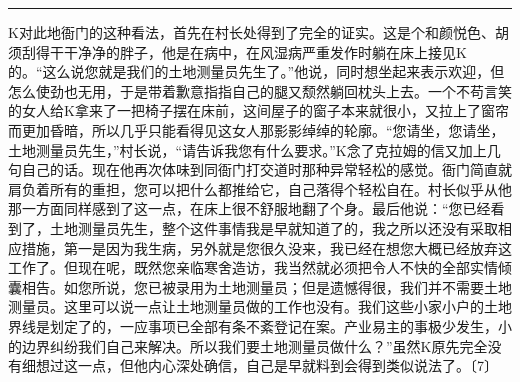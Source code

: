 \documentclass[12pt,a4paper]{article}
\begin{document}
\noindent\rule{\textwidth}{0.4pt}

\vspace{0.3em}



K对此地衙门的这种看法，首先在村长处得到了完全的证实。这是个和颜悦色、胡须刮得干干净净的胖子，他是在病中，在风湿病严重发作时躺在床上接见K的。“这么说您就是我们的土地测量员先生了。”他说，同时想坐起来表示欢迎，但怎么使劲也无用，于是带着歉意指指自己的腿又颓然躺回枕头上去。一个不苟言笑的女人给K拿来了一把椅子摆在床前，这间屋子的窗子本来就很小，又拉上了窗帘而更加昏暗，所以几乎只能看得见这女人那影影绰绰的轮廓。“您请坐，您请坐，土地测量员先生，”村长说，“请告诉我您有什么要求。”K念了克拉姆的信又加上几句自己的话。现在他再次体味到同衙门打交道时那种异常轻松的感觉。衙门简直就肩负着所有的重担，您可以把什么都推给它，自己落得个轻松自在。村长似乎从他那一方面同样感到了这一点，在床上很不舒服地翻了个身。最后他说：“您已经看到了，土地测量员先生，整个这件事情我是早就知道了的，我之所以还没有采取相应措施，第一是因为我生病，另外就是您很久没来，我已经在想您大概已经放弃这工作了。但现在呢，既然您亲临寒舍造访，我当然就必须把令人不快的全部实情倾囊相告。如您所说，您已被录用为土地测量员；但是遗憾得很，我们并不需要土地测量员。这里可以说一点让土地测量员做的工作也没有。我们这些小家小户的土地界线是划定了的，一应事项已全部有条不紊登记在案。产业易主的事极少发生，小的边界纠纷我们自己来解决。所以我们要土地测量员做什么？”虽然K原先完全没有细想过这一点，但他内心深处确信，自己是早就料到会得到类似说法了。〔7〕
\end{document}
